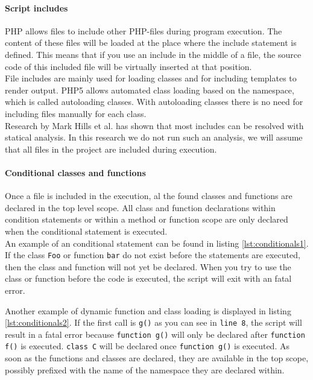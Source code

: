 \documentclass[../main.tex]{subfiles}
\begin{document}
    \paragraph{Script includes}
    PHP allows files to include other PHP-files during program execution. 
    The content of these files will be loaded at the place where the include statement is defined. 
    This means that if you use an include in the middle of a file, the source code of this included file will be virtually inserted at that position.
    \\
    File includes are mainly used for loading classes and for including templates to render output.
    PHP5 allows automated class loading based on the namespace, which is called autoloading classes.
    With autoloading classes there is no need for including files manually for each class.
    \\
    Research by Mark Hills et al.\cite{Hil:14} has shown that most includes can be resolved with statical analysis.
    In this research we do not run such an analysis, we will assume that all files in the project are included during execution.
    
    \paragraph{Conditional classes and functions}
    Once a file is included in the execution, al the found classes and functions are declared in the top level scope.
    All class and function declarations within condition statements or within a method or function scope are only declared when the conditional statement  is executed.
    \\
    An example of an conditional statement can be found in listing \ref{lst:conditionals1}.
    If the class \texttt{Foo} or function \texttt{bar} do not exist before the statements are executed, then the class and function will not yet be declared. 
    When you try to use the class or function before the code is executed, the script will exit with an fatal error.

    

    Another example of dynamic function and class loading is displayed in listing \ref{lst:conditionals2}.
    If the first call is \texttt{g()} as you can see in \texttt{line 8}, the script will result in a fatal error because \texttt{function g()} will only be declared after \texttt{function f()} is executed.
    \texttt{class C} will be declared once \texttt{function g()} is executed.
    As soon as the functions and classes are declared, they are available in the top scope, possibly prefixed with the name of the namespace they are declared within.
    
\end{document}
